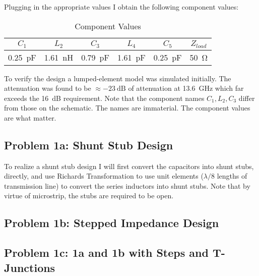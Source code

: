\documentclass{article}
\begin{document}
    Plugging in the appropriate values I obtain the following component values:
    
    \begin{table}[h]
        \centering
        \caption{Component Values}
        \label{tab:1a_comp_values}
        \begin{tabular}{|c|c|c|c|c|c|}
            \hline $C_1$ & $L_2$  & $C_3$ & $L_4$ & $C_5$ & $
            Z_{load}$ \\ 
            \hline \SI{.25}{\pico\farad}  & \SI{1.61}{\nano\henry} &
            \SI{.79}{\pico\farad}  & \SI{1.61}{\pico\farad}  &
            \SI{.25}{\pico\farad} &
            \SI{50}{\ohm}  \\
            \hline
        \end{tabular}
    \end{table}

    To verify the design a lumped-element model was simulated initially. The
    attenuation was found to be $\approx \SI{-23}{\deci\bel}$ of attenuation at
    \SI{13.6}{\giga\hertz} which far exceeds the \SI{16}{\deci\bel} requirement.
    Note that the component names $C_1, L_2, C_3$ differ from those on the
    schematic. The names are immaterial. The component values are what matter.

    \subsection*{Problem 1a: Shunt Stub Design}
        To realize a shunt stub design I will first convert the capacitors into
        shunt stubs, directly, and use Richards Transformation to use unit
        elements ($\lambda/8$ lengths of transmission line) to convert the
        series inductors into shunt stubs. Note that by virtue of microstrip,
        the stubs are required to be open.

    \subsection*{Problem 1b: Stepped Impedance Design}
    \subsection*{Problem 1c: 1a and 1b with Steps and T-Junctions}
\end{document}
